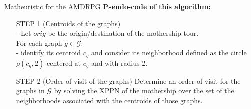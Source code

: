 \documentclass[slidestop,usepdftitle=false,10pt]{beamer}
\begin{document}
	\begin{frame}{Matheuristic for the AMDRPG}
	   \textbf{Pseudo-code of this algorithm:}
	   \begin{itemize} 
            \item[STEP 1] (Centroids of the graphs)\\
            - Let $orig$ be the origin/destination of the mothership tour. \\ %
            For each graph $g \in \mathcal G$:\\
            - identify its centroid $c_g$ and consider its neighborhood defined as the circle $\rho(c_g,2)$ centered at $c_g$ and with radius 2. %
            \item[STEP 2] (Order of visit of the graphs)
            Determine an order of visit for the graphs in $\mathcal{G}$ by solving the XPPN of the mothership over the set of the neighborhoods associated with the centroids of those graphs. %
        \end{itemize}
    \end{frame}
    
\end{document}
